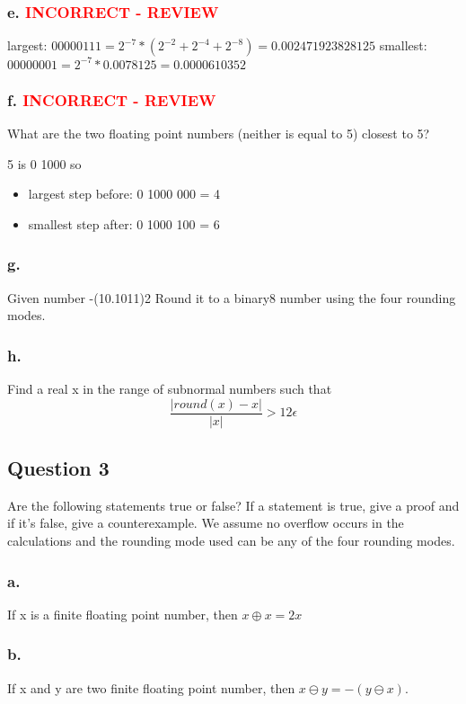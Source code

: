 \documentclass[12pt,a4paper]{article}
\begin{document}
\subsubsection*{e. \textcolor{red}{INCORRECT - REVIEW}} 
largest: $0 0000 111 =2^{-7} * (2^{-2} + 2^{-4} + 2^{-8}) = 0.002471923828125 $
\newline
smallest: $0 0000 001 = 2^{-7} * 0.0078125 = {0.0000610352}$

\subsubsection*{f. \textcolor{red}{INCORRECT - REVIEW}}

What are the two floating point numbers (neither is equal to 5) closest to 5?

5 is 0 1000 so
\begin{itemize}
	\item largest step before: 0 1000 000 = 4
	\item smallest step after: 0 1000 100 = 6
\end{itemize}

\subsubsection*{g.}
Given number -(10.1011)2
Round it to a binary8 number using the four rounding modes.
\subsubsection*{h.}
 Find a real x
 in the range of subnormal numbers such that
$$\frac{|round(x)-x|}{|x|}>12 \epsilon$$
\vfill
\newpage

\subsection*{Question 3}

Are the following statements true or false? If a statement is true, give a proof and if it's false, give a counterexample. We assume no overflow occurs in the calculations and the rounding mode used can be any of the four rounding modes.

\subsubsection*{a.} 
If x is a finite floating point number, then $x \oplus x =2x$

\subsubsection*{b.} 
 If x and y are two finite floating point number, then $x\ominus y=-(y\ominus x)$.
\end{document}

